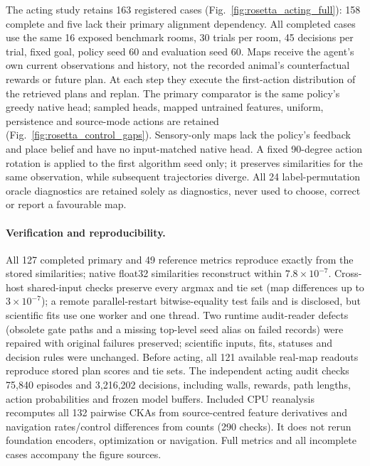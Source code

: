 \documentclass[10pt,onecolumn,letterpaper]{article}
\begin{document}
The acting study retains 163 registered cases (Fig.~\ref{fig:rosetta_acting_full}): 158 complete and five lack their primary alignment dependency.
All completed cases use the same 16 exposed benchmark rooms, 30 trials per room, 45 decisions per trial,
fixed goal, policy seed 60 and evaluation seed 60. Maps receive the agent's own current observations and history,
not the recorded animal's counterfactual rewards or future plan. At each step they execute the first-action
distribution of the retrieved plans and replan. The primary comparator is the same policy's greedy native head;
sampled heads, mapped untrained features, uniform, persistence and source-mode actions are retained (Fig.~\ref{fig:rosetta_control_gaps}). Sensory-only
maps lack the policy's feedback and place belief and have no input-matched native head. A fixed 90-degree action
rotation is applied to the first algorithm seed only; it preserves similarities for the same observation, while
subsequent trajectories diverge. All 24 label-permutation oracle diagnostics are retained solely as diagnostics,
never used to choose, correct or report a favourable map.

\paragraph{Verification and reproducibility.}
All 127 completed primary and 49 reference metrics reproduce exactly from the stored similarities; native
float32 similarities reconstruct within $7.8\times10^{-7}$. Cross-host shared-input checks preserve every argmax
and tie set (map differences up to $3\times10^{-7}$); a remote parallel-restart bitwise-equality test fails and is
disclosed, but scientific fits use one worker and one thread. Two runtime audit-reader defects (obsolete gate
paths and a missing top-level seed alias on failed records) were repaired with original failures preserved;
scientific inputs, fits, statuses and decision rules were unchanged. Before acting, all 121 available real-map
readouts reproduce stored plan scores and tie sets. The independent acting audit checks 75,840 episodes and
3,216,202 decisions, including walls, rewards, path lengths, action probabilities and frozen model buffers.
Included CPU reanalysis recomputes all 132 pairwise CKAs from source-centred feature derivatives and navigation
rates/control differences from counts (290 checks). It does not rerun foundation encoders, optimization or
navigation. Full metrics and all incomplete cases accompany the figure sources.
\end{document}
